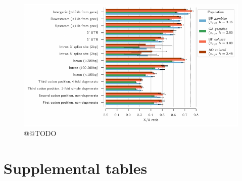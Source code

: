 \documentclass[a4paper,11pt,abstracton,hidelinks]{scrartcl}
\begin{document}
\clearpage
\begin{figure}[h]
\centering
\includegraphics[width=1.1\textwidth,center]{artwork/chapter3/feature_pi_ratios.pdf}
\caption{@@TODO
}
%
\label{fig:feature_pi_ratios}
\end{figure}


\clearpage
\section{Supplemental tables}
\end{document}
